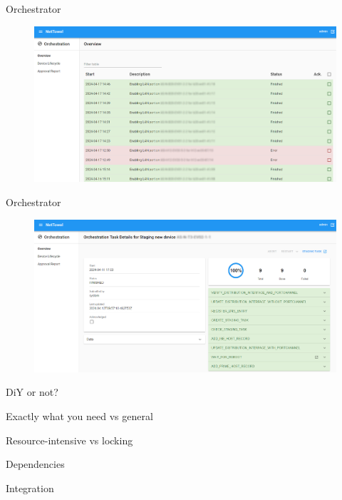 \documentclass[aspectratio=169]{beamer}
\begin{document}

\begin{frame}{Orchestrator}

  \begin{figure}
    \includegraphics[height = 0.8\textheight]{images/nettowel_orchestration_overview.png}
  \end{figure}

\end{frame}



\begin{frame}{Orchestrator}

  \begin{figure}
    \includegraphics[height = 0.8\textheight]{images/nettowel_orchestration_new_device.png}
  \end{figure}

\end{frame}


\begin{frame}{DiY or not?}

  \begin{vfilleditems}
    \item Exactly what you need vs general
    \item Resource-intensive vs locking
    \item Dependencies
    \item Integration
  \end{vfilleditems}

\end{frame}
\end{document}
